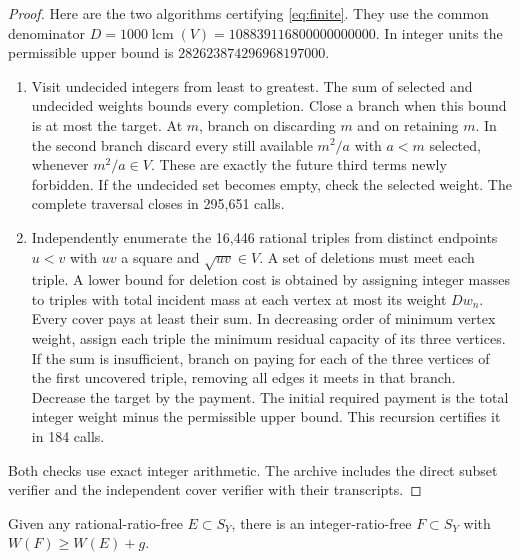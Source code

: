 \documentclass[11pt]{article}
\begin{document}
\begin{proof}
Here are the two algorithms certifying \eqref{eq:finite}. They use the common denominator $D=1000\operatorname{lcm}(V)=108839116800000000000$. In integer units the permissible upper bound is $282623874296968197000$.
\begin{enumerate}
\item Visit undecided integers from least to greatest. The sum of selected and undecided weights bounds every completion. Close a branch when this bound is at most the target. At $m$, branch on discarding $m$ and on retaining $m$. In the second branch discard every still available $m^2/a$ with $a<m$ selected, whenever $m^2/a\in V$. These are exactly the future third terms newly forbidden. If the undecided set becomes empty, check the selected weight. The complete traversal closes in 295,651 calls.
\item Independently enumerate the 16,446 rational triples from distinct endpoints $u<v$ with $uv$ a square and $\sqrt{uv}\in V$. A set of deletions must meet each triple. A lower bound for deletion cost is obtained by assigning integer masses to triples with total incident mass at each vertex at most its weight $Dw_n$. Every cover pays at least their sum. In decreasing order of minimum vertex weight, assign each triple the minimum residual capacity of its three vertices. If the sum is insufficient, branch on paying for each of the three vertices of the first uncovered triple, removing all edges it meets in that branch. Decrease the target by the payment. The initial required payment is the total integer weight minus the permissible upper bound. This recursion certifies it in 184 calls.
\end{enumerate}
Both checks use exact integer arithmetic. The archive includes the direct subset verifier and the independent cover verifier with their transcripts.
\end{proof}
\begin{lemma}\label{l:patch}
Given any rational-ratio-free $E\subset S_Y$, there is an integer-ratio-free $F\subset S_Y$ with $W(F)\ge W(E)+g$.
\end{lemma}
\end{document}
